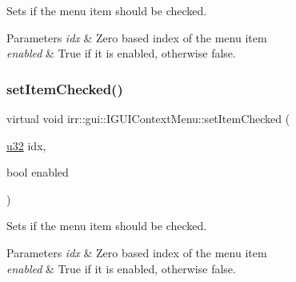 Sets if the menu item should be checked. 


\begin{DoxyParams}{Parameters}
{\em idx} & Zero based index of the menu item \\
\hline
{\em enabled} & True if it is enabled, otherwise false. \\
\hline
\end{DoxyParams}
\mbox{\label{classirr_1_1gui_1_1IGUIContextMenu_a8abbd1587dcc462f60660d7e606e954e}} 
\subsubsection{\texorpdfstring{set\+Item\+Checked()}{setItemChecked()}\hspace{0.1cm}{\footnotesize\ttfamily [2/2]}}
{\footnotesize\ttfamily virtual void irr\+::gui\+::\+I\+G\+U\+I\+Context\+Menu\+::set\+Item\+Checked (\begin{DoxyParamCaption}\item[{\hyperlink{namespaceirr_a0416a53257075833e7002efd0a18e804}{u32}}]{idx,  }\item[{bool}]{enabled }\end{DoxyParamCaption})\hspace{0.3cm}{\ttfamily [pure virtual]}}



Sets if the menu item should be checked. 


\begin{DoxyParams}{Parameters}
{\em idx} & Zero based index of the menu item \\
\hline
{\em enabled} & True if it is enabled, otherwise false. \\
\hline
\end{DoxyParams}
\mbox{\label{classirr_1_1gui_1_1IGUIContextMenu_a1380ff56d8c4c5b8de8d221062464654}} 
